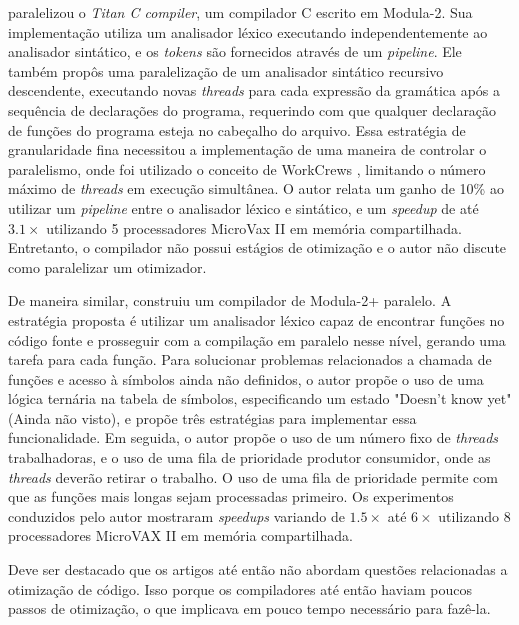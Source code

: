 \cite{vandevoorde1988parallel} paralelizou o \textit{Titan C compiler}, um compilador
C escrito em Modula-2. Sua implementação utiliza um analisador léxico executando
independentemente ao analisador sintático, e os \textit{tokens} são fornecidos
através de um \textit{pipeline}. Ele também propôs uma paralelização de um
analisador sintático recursivo descendente, executando novas \textit{threads}
para cada expressão da gramática após a sequência de declarações do programa,
requerindo com que qualquer declaração de funções do programa esteja no cabeçalho do
arquivo. Essa estratégia de granularidade fina necessitou a implementação de
uma maneira de controlar o paralelismo, onde foi utilizado o conceito de
WorkCrews \citep{vandevoorde1988workcrews}, limitando o número máximo de
\textit{threads} em execução simultânea. O autor relata um ganho de 10\% ao
utilizar um \textit{pipeline} entre o analisador léxico e sintático, e um
\textit{speedup} de até $3.1\times$ utilizando 5 processadores MicroVax II em
memória compartilhada.  Entretanto, o compilador não possui estágios de
otimização e o autor não discute como paralelizar um otimizador.

De maneira similar, \cite{wortman1992} construiu um compilador de Modula-2+
paralelo. A estratégia proposta é utilizar um analisador léxico capaz de
encontrar funções no código fonte e prosseguir com a compilação em paralelo
nesse nível, gerando uma tarefa para cada função. Para solucionar problemas
relacionados a chamada de funções e
acesso à símbolos ainda não definidos, o autor propõe o uso de
uma lógica ternária na tabela de símbolos, especificando um estado
"Doesn't know yet" (Ainda não visto), e propõe três estratégias para
implementar essa funcionalidade. Em seguida, o autor propõe o uso de
um número fixo de \textit{threads} trabalhadoras, e o uso de uma fila de
prioridade produtor consumidor, onde as \textit{threads} deverão retirar o trabalho.
O uso de uma fila de prioridade permite com que as funções mais longas sejam
processadas primeiro. Os experimentos conduzidos pelo autor mostraram
\textit{speedups} variando de $1.5\times$ até $6\times$ utilizando 8
processadores MicroVAX II em memória compartilhada.

Deve ser destacado que os artigos até então não abordam questões relacionadas
a otimização de código. Isso porque os compiladores até então haviam poucos
passos de otimização, o que implicava em pouco tempo necessário para fazê-la.

